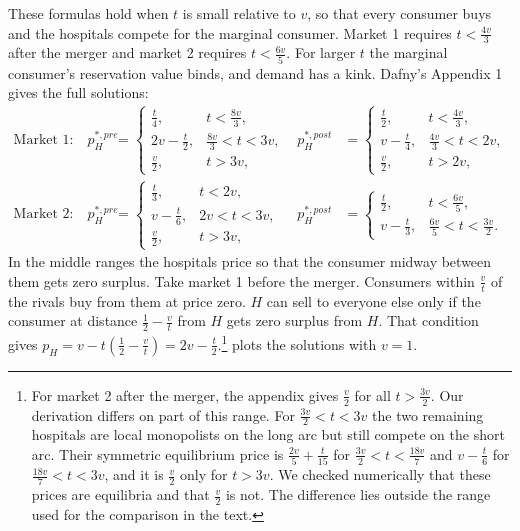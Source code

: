 These formulas hold when $t$ is small relative to $v$, so that every consumer buys and the hospitals compete for
the marginal consumer. Market 1 requires $t<\frac{4v}{3}$ after the merger and market 2 requires
$t<\frac{6v}{5}$. For larger $t$ the marginal consumer's reservation value binds, and demand has a kink. Dafny's
Appendix 1 gives the full solutions:
\begin{align*}
\text{Market 1:}\quad
p_H^{*,pre}&=\begin{cases}\frac{t}{4}, & t<\frac{8v}{3},\\[2pt] 2v-\frac{t}{2}, & \frac{8v}{3}<t<3v,\\[2pt] \frac{v}{2}, & t>3v,\end{cases}
&
p_H^{*,post}&=\begin{cases}\frac{t}{2}, & t<\frac{4v}{3},\\[2pt] v-\frac{t}{4}, & \frac{4v}{3}<t<2v,\\[2pt] \frac{v}{2}, & t>2v,\end{cases}\\[4pt]
\text{Market 2:}\quad
p_H^{*,pre}&=\begin{cases}\frac{t}{3}, & t<2v,\\[2pt] v-\frac{t}{6}, & 2v<t<3v,\\[2pt] \frac{v}{2}, & t>3v,\end{cases}
&
p_H^{*,post}&=\begin{cases}\frac{t}{2}, & t<\frac{6v}{5},\\[2pt] v-\frac{t}{3}, & \frac{6v}{5}<t<\frac{3v}{2}.\end{cases}
\end{align*}
In the middle ranges the hospitals price so that the consumer midway between them gets zero surplus. Take market 1
before the merger. Consumers within $\frac{v}{t}$ of the rivals buy from them at price zero. $H$ can sell to
everyone else only if the consumer at distance $\frac{1}{2}-\frac{v}{t}$ from $H$ gets zero surplus from $H$. That
condition gives $p_H=v-t(\frac{1}{2}-\frac{v}{t})=2v-\frac{t}{2}$.\footnote{For market 2 after the merger, the
appendix gives $\frac{v}{2}$ for all $t>\frac{3v}{2}$. Our derivation differs on part of this range. For
$\frac{3v}{2}<t<3v$ the two remaining hospitals are local monopolists on the long arc but still compete on the
short arc. Their symmetric equilibrium price is $\frac{2v}{5}+\frac{t}{15}$ for $\frac{3v}{2}<t<\frac{18v}{7}$ and
$v-\frac{t}{6}$ for $\frac{18v}{7}<t<3v$, and it is $\frac{v}{2}$ only for $t>3v$. We checked numerically that these
prices are equilibria and that $\frac{v}{2}$ is not. The difference lies outside
the range used for the comparison in the text.}  plots the solutions with $v=1$.

